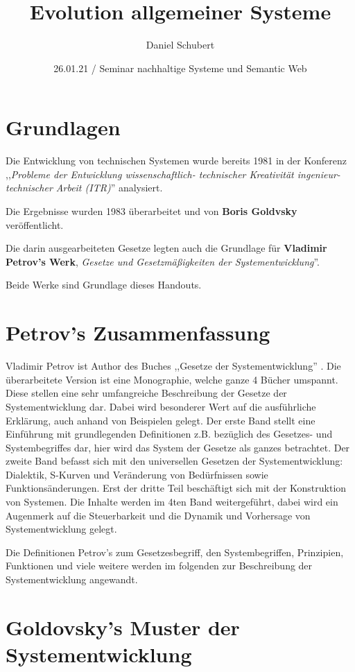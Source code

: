 \documentclass[a4paper,12pt]{article}
\title{Evolution allgemeiner Systeme}
\author{Daniel Schubert}
\date{26.01.21 / Seminar nachhaltige Systeme und Semantic Web}
\begin{document}
\maketitle

\section{Grundlagen}
Die Entwicklung von technischen Systemen wurde bereits 1981 in der Konferenz ,,\emph{Probleme der Entwicklung wissenschaftlich- technischer Kreativität ingenieur-technischer Arbeit (ITR)}'' analysiert. \medskip

Die Ergebnisse wurden 1983 überarbeitet und von \textbf{Boris Goldvsky} veröffentlicht. \medskip

Die darin ausgearbeiteten Gesetze legten auch die Grundlage für \textbf{Vladimir Petrov's Werk}, \emph{Gesetze und Gesetzmäßigkeiten der Systementwicklung}''. \medskip

Beide Werke sind Grundlage dieses Handouts.

\section{Petrov's Zusammenfassung}

Vladimir Petrov ist Author des Buches ,,Gesetze der Systementwicklung'' . Die überarbeitete Version ist eine Monographie, welche ganze 4 Bücher umspannt. Diese stellen eine sehr umfangreiche Beschreibung der Gesetze der Systementwicklung dar. Dabei wird besonderer Wert auf die ausführliche Erklärung, auch anhand von Beispielen gelegt. Der erste Band stellt eine Einführung mit grundlegenden Definitionen z.B. bezüglich des Gesetzes- und Systembegriffes dar, hier wird das System der Gesetze als ganzes betrachtet. Der zweite Band befasst sich mit den universellen Gesetzen der Systementwicklung: Dialektik, S-Kurven und Veränderung von Bedürfnissen sowie Funktionsänderungen. Erst der dritte Teil beschäftigt sich mit der Konstruktion von Systemen. Die Inhalte werden im 4ten Band weitergeführt, dabei wird ein Augenmerk auf die Steuerbarkeit und die Dynamik und Vorhersage von Systementwicklung gelegt. \medskip

Die Definitionen Petrov's zum Gesetzesbegriff, den Systembegriffen, Prinzipien, Funktionen und viele weitere werden im folgenden zur Beschreibung der Systementwicklung angewandt.

\clearpage
\section{Goldovsky's Muster der Systementwicklung}
\end{document}
